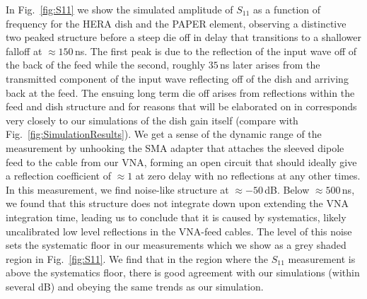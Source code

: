 \documentclass[twocolumn]{emulateapj}
\begin{document}
In Fig.~\ref{fig:S11} we show the simulated amplitude of $S_{11}$ as a function of frequency for the HERA dish and the PAPER element, observing a distinctive two peaked structure before a steep die off in delay that transitions to a shallower falloff at $\approx 150$\,ns. The first peak is due to the reflection of the input wave off of the back of the feed while the second, roughly $35$\,ns later arises from the transmitted component of the input wave reflecting off of the dish and arriving back at the feed. The ensuing long term die off arises from reflections within the feed and dish structure and for reasons that will be elaborated on in \citet{Patra:2016} corresponds very closely to our simulations of the dish gain itself (compare with Fig.~\ref{fig:SimulationResults}).  We get a sense of the dynamic range of the measurement by unhooking the SMA adapter that attaches the sleeved dipole feed to the cable from our VNA, forming an open circuit that should ideally give a reflection coefficient of $\approx 1$ at zero delay with no reflections at any other times. In this measurement, we find noise-like structure at $\approx -50$\,dB. Below $\approx 500$\,ns, we found that this structure does not integrate down upon extending the VNA integration time, leading us to conclude that it is caused by systematics, likely uncalibrated low level reflections in the VNA-feed cables. The level of this noise sets the systematic floor in our measurements which we show as a grey shaded region in Fig.~\ref{fig:S11}. We find that in the region where the $S_{11}$ measurement is above the systematics floor, there is good agreement with our simulations (within several dB) and obeying the same trends as our simulation.
\end{document}
